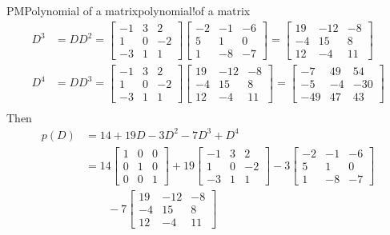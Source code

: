 \begin{example}{PM}{Polynomial of a matrix}{polynomial!of a matrix}
\begin{align*}
%
D^3&=DD^2=
\begin{bmatrix}-1 & 3 & 2\\1 & 0 & -2\\-3 & 1 & 1\end{bmatrix}
\begin{bmatrix}-2 & -1 & -6\\5 & 1 & 0\\1 & -8 & -7\end{bmatrix}
=
\begin{bmatrix}19 & -12 & -8\\-4 & 15 & 8\\12 & -4 & 11\end{bmatrix}\\
%
D^4&=DD^3=
\begin{bmatrix}-1 & 3 & 2\\1 & 0 & -2\\-3 & 1 & 1\end{bmatrix}
\begin{bmatrix}19 & -12 & -8\\-4 & 15 & 8\\12 & -4 & 11\end{bmatrix}
=
\begin{bmatrix}-7 & 49 & 54\\-5 & -4 & -30\\-49 & 47 & 43\end{bmatrix}\\
%
\end{align*}
%
Then
%
\begin{align*}
p(D)&=14+19D-3D^2-7D^3+D^4\\
&=
  14\begin{bmatrix}1 & 0 & 0\\0 & 1 & 0\\0 & 0 & 1\end{bmatrix}
+19\begin{bmatrix}-1 & 3 & 2\\1 & 0 & -2\\-3 & 1 & 1\end{bmatrix}
   -3\begin{bmatrix}-2 & -1 & -6\\5 & 1 & 0\\1 & -8 & -7\end{bmatrix}\\
&\quad\quad
   -7\begin{bmatrix}19 & -12 & -8\\-4 & 15 & 8\\12 & -4 & 11\end{bmatrix}

\end{align*}
\end{example}
